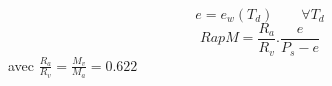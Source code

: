 \[
e = e_w(T_d) \qquad \forall T_d
\]
\[
RapM = \frac{R_a}{R_v} . \frac{e}{P_s - e } 
\]
avec $\frac{R_a}{R_v} = \frac{M_v}{M_a} = 0.622$
